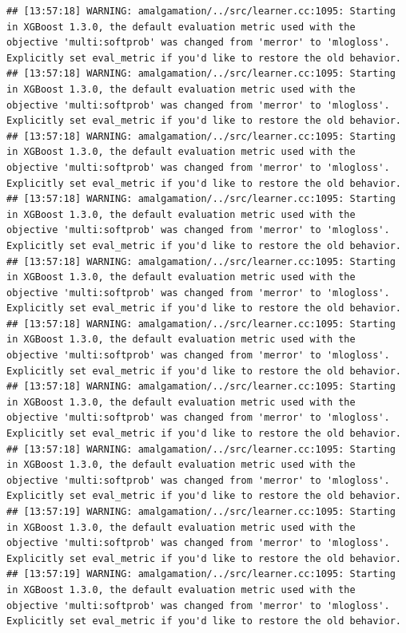 \documentclass[
]{scrbook}
\begin{document}
\begin{verbatim}
## [13:57:18] WARNING: amalgamation/../src/learner.cc:1095: Starting in XGBoost 1.3.0, the default evaluation metric used with the objective 'multi:softprob' was changed from 'merror' to 'mlogloss'. Explicitly set eval_metric if you'd like to restore the old behavior.
## [13:57:18] WARNING: amalgamation/../src/learner.cc:1095: Starting in XGBoost 1.3.0, the default evaluation metric used with the objective 'multi:softprob' was changed from 'merror' to 'mlogloss'. Explicitly set eval_metric if you'd like to restore the old behavior.
## [13:57:18] WARNING: amalgamation/../src/learner.cc:1095: Starting in XGBoost 1.3.0, the default evaluation metric used with the objective 'multi:softprob' was changed from 'merror' to 'mlogloss'. Explicitly set eval_metric if you'd like to restore the old behavior.
## [13:57:18] WARNING: amalgamation/../src/learner.cc:1095: Starting in XGBoost 1.3.0, the default evaluation metric used with the objective 'multi:softprob' was changed from 'merror' to 'mlogloss'. Explicitly set eval_metric if you'd like to restore the old behavior.
## [13:57:18] WARNING: amalgamation/../src/learner.cc:1095: Starting in XGBoost 1.3.0, the default evaluation metric used with the objective 'multi:softprob' was changed from 'merror' to 'mlogloss'. Explicitly set eval_metric if you'd like to restore the old behavior.
## [13:57:18] WARNING: amalgamation/../src/learner.cc:1095: Starting in XGBoost 1.3.0, the default evaluation metric used with the objective 'multi:softprob' was changed from 'merror' to 'mlogloss'. Explicitly set eval_metric if you'd like to restore the old behavior.
## [13:57:18] WARNING: amalgamation/../src/learner.cc:1095: Starting in XGBoost 1.3.0, the default evaluation metric used with the objective 'multi:softprob' was changed from 'merror' to 'mlogloss'. Explicitly set eval_metric if you'd like to restore the old behavior.
## [13:57:18] WARNING: amalgamation/../src/learner.cc:1095: Starting in XGBoost 1.3.0, the default evaluation metric used with the objective 'multi:softprob' was changed from 'merror' to 'mlogloss'. Explicitly set eval_metric if you'd like to restore the old behavior.
## [13:57:19] WARNING: amalgamation/../src/learner.cc:1095: Starting in XGBoost 1.3.0, the default evaluation metric used with the objective 'multi:softprob' was changed from 'merror' to 'mlogloss'. Explicitly set eval_metric if you'd like to restore the old behavior.
## [13:57:19] WARNING: amalgamation/../src/learner.cc:1095: Starting in XGBoost 1.3.0, the default evaluation metric used with the objective 'multi:softprob' was changed from 'merror' to 'mlogloss'. Explicitly set eval_metric if you'd like to restore the old behavior.

\end{verbatim}
\end{document}
